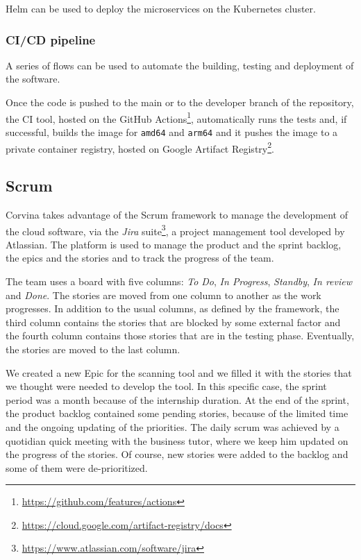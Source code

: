 Helm can be used to deploy the microservices on the Kubernetes cluster.

\subsubsection{CI/CD pipeline}

A series of flows can be used to automate the building, testing and deployment of the software.

Once the code is pushed to the main or to the developer branch of the repository, the CI tool, hosted on the GitHub Actions\footnote{\url{https://github.com/features/actions}}, automatically runs the tests and, if successful, builds the image for \texttt{amd64} and \texttt{arm64} and it pushes the image to a private container registry, hosted on Google Artifact Registry\footnote{\url{https://cloud.google.com/artifact-registry/docs}}.

\subsection{Scrum}

Corvina takes advantage of the Scrum framework to manage the development of the cloud software, via the \textit{Jira} suite\footnote{\url{https://www.atlassian.com/software/jira}}, a project management tool developed by Atlassian. The platform is used to manage the product and the sprint backlog, the epics and the stories and to track the progress of the team.

The team uses a board with five columns: \textit{To Do}, \textit{In Progress}, \textit{Standby}, \textit{In review} and \textit{Done}. The stories are moved from one column to another as the work progresses. In addition to the usual columns, as defined by the framework, the third column contains the stories that are blocked by some external factor and the fourth column contains those stories that are in the testing phase. Eventually, the stories are moved to the last column.

We created a new Epic for the scanning tool and we filled it with the stories that we thought were needed to develop the tool. In this specific case, the sprint period was a month because of the internship duration. At the end of the sprint, the product backlog contained some pending stories, because of the limited time and the ongoing updating of the priorities. The daily scrum was achieved by a quotidian quick meeting with the business tutor, where we keep him updated on the progress of the stories. Of course, new stories were added to the backlog and some of them were de-prioritized.

